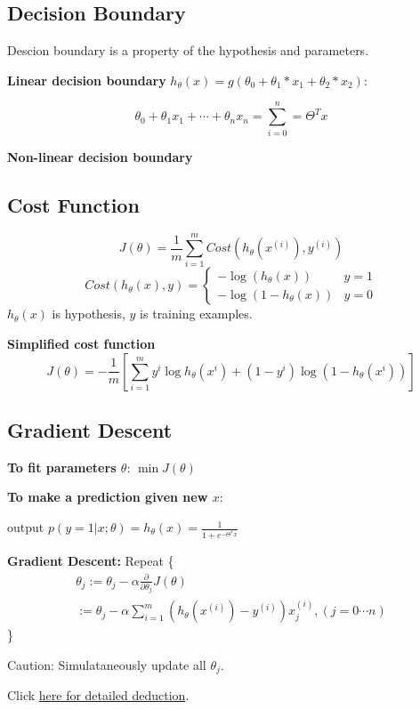 \documentclass{article}
\begin{document}
\subsection{Decision Boundary} %

Descion boundary is a property of the hypothesis and parameters.

\textbf{Linear decision boundary}
$h_\theta(x)=g(\theta_0+\theta_1*x_1+\theta_2*x_2)$:

$$\theta_0+\theta_1x_1+\cdots+\theta_nx_n=\sum_{i=0}^{n}=\Theta^Tx$$

\textbf{Non-linear decision boundary}

\subsection{Cost Function}
$$	J(\theta)=\frac{1}{m}\sum_{i=1}^{m}Cost(h_\theta(x^{(i)}),y^{(i)})$$
\begin{displaymath}
		Cost(h_\theta(x),y)=\left\{\begin{array}{ll}
					-\log(h_\theta(x)) & y=1\\
					-\log(1-h_\theta(x)) & y=0
					\end{array}\right.
\end{displaymath}
$h_\theta(x)$ is hypothesis, $y$ is training examples.

\textbf{Simplified cost function}
$$J(\theta)=-\frac{1}{m}[\sum_{i=1}^{m}y^i\log h_\theta(x^i)+(1-y^i)\log (1-h_\theta(x^i))]$$

\subsection{Gradient Descent}
\textbf{To fit parameters $\theta$}:
$\min J(\theta)$

\textbf{To make a prediction given new $x$}:

output $p(y=1|x;\theta)=h_\theta(x)=\frac{1}{1+e^{-\Theta^Tx}}$

\textbf{Gradient Descent:}
Repeat \{
\begin{eqnarray}
\theta_j := \theta_j - \alpha\frac{\partial}{\partial\theta_j}J(\theta) \nonumber \\
:= \theta_j - \alpha\sum_{i=1}^{m}(h_\theta(x^{(i)})-y^{(i)})x_j^{(i)},(j=0\cdots n)\nonumber
\end{eqnarray}
\}

Caution: Simulataneously update all $\theta_j$.

Click \href{http://blog.csdn.net/dongtingzhizi/article/details/15962797}{here for detailed deduction}.
\end{document}
